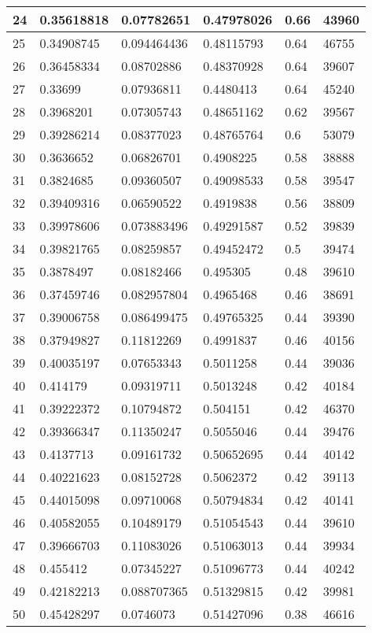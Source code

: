 \begin{longtable}{|l|l|l|l|l|l|}
24 & 0.35618818 & 0.07782651 & 0.47978026 & 0.66 & 43960 \\ \hline 
25 & 0.34908745 & 0.094464436 & 0.48115793 & 0.64 & 46755 \\ \hline 
26 & 0.36458334 & 0.08702886 & 0.48370928 & 0.64 & 39607 \\ \hline 
27 & 0.33699 & 0.07936811 & 0.4480413 & 0.64 & 45240 \\ \hline 
28 & 0.3968201 & 0.07305743 & 0.48651162 & 0.62 & 39567 \\ \hline 
29 & 0.39286214 & 0.08377023 & 0.48765764 & 0.6 & 53079 \\ \hline 
30 & 0.3636652 & 0.06826701 & 0.4908225 & 0.58 & 38888 \\ \hline 
31 & 0.3824685 & 0.09360507 & 0.49098533 & 0.58 & 39547 \\ \hline 
32 & 0.39409316 & 0.06590522 & 0.4919838 & 0.56 & 38809 \\ \hline 
33 & 0.39978606 & 0.073883496 & 0.49291587 & 0.52 & 39839 \\ \hline 
34 & 0.39821765 & 0.08259857 & 0.49452472 & 0.5 & 39474 \\ \hline 
35 & 0.3878497 & 0.08182466 & 0.495305 & 0.48 & 39610 \\ \hline 
36 & 0.37459746 & 0.082957804 & 0.4965468 & 0.46 & 38691 \\ \hline 
37 & 0.39006758 & 0.086499475 & 0.49765325 & 0.44 & 39390 \\ \hline 
38 & 0.37949827 & 0.11812269 & 0.4991837 & 0.46 & 40156 \\ \hline 
39 & 0.40035197 & 0.07653343 & 0.5011258 & 0.44 & 39036 \\ \hline 
40 & 0.414179 & 0.09319711 & 0.5013248 & 0.42 & 40184 \\ \hline 
41 & 0.39222372 & 0.10794872 & 0.504151 & 0.42 & 46370 \\ \hline 
42 & 0.39366347 & 0.11350247 & 0.5055046 & 0.44 & 39476 \\ \hline 
43 & 0.4137713 & 0.09161732 & 0.50652695 & 0.44 & 40142 \\ \hline 
44 & 0.40221623 & 0.08152728 & 0.5062372 & 0.42 & 39113 \\ \hline 
45 & 0.44015098 & 0.09710068 & 0.50794834 & 0.42 & 40141 \\ \hline 
46 & 0.40582055 & 0.10489179 & 0.51054543 & 0.44 & 39610 \\ \hline 
47 & 0.39666703 & 0.11083026 & 0.51063013 & 0.44 & 39934 \\ \hline 
48 & 0.455412 & 0.07345227 & 0.51096773 & 0.44 & 40242 \\ \hline 
49 & 0.42182213 & 0.088707365 & 0.51329815 & 0.42 & 39981 \\ \hline 
50 & 0.45428297 & 0.0746073 & 0.51427096 & 0.38 & 46616 \\ \hline 
\end{longtable}